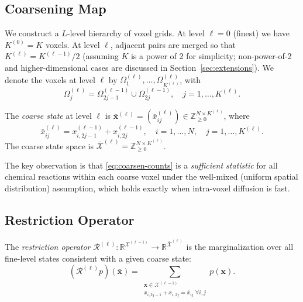 \documentclass[review,onefignum,onetabnum]{siamart171218}
\newcommand{\bx}{\mathbf{x}}
\newcommand{\R}{\mathbb{R}}
\newcommand{\Znn}{\mathbb{Z}_{\geq 0}}
\newcommand{\calX}{\mathcal{X}}
\newcommand{\calR}{\mathcal{R}}
\begin{document}
\subsection{Coarsening Map}
\label{sec:coarsen}

We construct a $L$-level hierarchy of voxel grids.  At level
$\ell = 0$ (finest) we have $K^{(0)} = K$ voxels.  At level
$\ell$, adjacent pairs are merged so that
$K^{(\ell)} = K^{(\ell-1)}/2$ (assuming $K$ is a power of 2 for
simplicity; non-power-of-2 and higher-dimensional cases are
discussed in Section~\ref{sec:extensions}).  We denote the voxels
at level $\ell$ by $\Omega_1^{(\ell)},\ldots,\Omega_{K^{(\ell)}}^{(\ell)}$,
with
\begin{equation}
  \Omega_j^{(\ell)} = \Omega_{2j-1}^{(\ell-1)} \cup \Omega_{2j}^{(\ell-1)},
  \quad j = 1,\ldots,K^{(\ell)}.
\end{equation}

\begin{definition}
  \label{def:coarse-state}
  The \emph{coarse state} at level $\ell$ is
  $\bar{\bx}^{(\ell)} = (\bar{x}_{ij}^{(\ell)}) \in \Znn^{N \times K^{(\ell)}}$,
  where
  \begin{equation}
    \label{eq:coarsen-counts}
    \bar{x}_{ij}^{(\ell)} = x_{i,2j-1}^{(\ell-1)} + x_{i,2j}^{(\ell-1)},
    \quad i=1,\ldots,N,\quad j=1,\ldots,K^{(\ell)}.
  \end{equation}
  The coarse state space is $\bar{\calX}^{(\ell)} = \Znn^{N \times K^{(\ell)}}$.
\end{definition}

The key observation is that \eqref{eq:coarsen-counts} is a
\emph{sufficient statistic} for all chemical reactions within
each coarse voxel under the well-mixed (uniform spatial
distribution) assumption, which holds exactly when intra-voxel
diffusion is fast.

\subsection{Restriction Operator}
\label{sec:restriction}

\begin{definition}[Restriction]
  \label{def:restriction}
  The \emph{restriction operator}
  $\calR^{(\ell)} : \R^{\calX^{(\ell-1)}} \to \R^{\bar{\calX}^{(\ell)}}$
  is the marginalization over all fine-level states consistent
  with a given coarse state:
  \begin{equation}
    \label{eq:restriction}
    (\calR^{(\ell)} p)(\bar{\bx})
    = \sum_{\substack{\bx \in \calX^{(\ell-1)} \\
        x_{i,2j-1}+x_{i,2j}=\bar{x}_{ij}\;\forall i,j}}
      p(\bx).
  \end{equation}
\end{definition}
\end{document}

